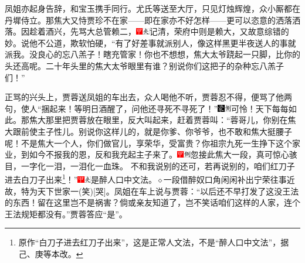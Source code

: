 凤姐亦起身告辞，和宝玉携手同行。尤氏等送至大厅，只见灯烛辉煌，众小厮都在丹墀侍立。那焦大又恃贾珍不在家------即在家亦不好怎样------更可以恣意的洒落洒落。因趁着酒兴，先骂大总管赖二，{\includegraphics[width=3mm]{../Images/00002}\includegraphics[width=3mm]{../Images/00012}\footnotesize \kaishu 记清，荣府中则是赖大，又故意综错的妙。}说他不公道，欺软怕硬，“有了好差事就派别人，像这样黑更半夜送人的事就派我。没良心的忘八羔子！瞎充管家！你也不想想，焦大太爷跷起一只脚，比你的头还高呢。二十年头里的焦大太爷眼里有谁？别说你们这把子的杂种忘八羔子们！”

正骂的兴头上，贾蓉送凤姐的车出去，众人喝他不听，贾蓉忍不得，便骂了他两句，使人“捆起来！等明日酒醒了，问他还寻死不寻死了！”{\includegraphics[width=3mm]{../Images/00006}\includegraphics[width=3mm]{../Images/00011}\footnotesize \kaishu 可怜！天下每每如此。}那焦大那里把贾蓉放在眼里，反大叫起来，赶着贾蓉叫：“蓉哥儿，你别在焦大跟前使主子性儿。别说你这样儿的，就是你爹、你爷爷，也不敢和焦大挺腰子呢！不是焦大一个人，你们做官儿，享荣华，受富贵？你祖宗九死一生挣下这个家业，到如今不报我的恩，反和我充起主子来了。{\includegraphics[width=3mm]{../Images/00002}\includegraphics[width=3mm]{../Images/00011}\footnotesize \kaishu 忽接此焦大一段，真可惊心骇目，一字化一泪，一泪化一血珠。
}不和我说别的还可，若再说别的，咱们红刀子进去白刀子出来\footnote{原作“白刀子进去红刀子出来”，这是正常人文法，不是“醉人口中文法”，据己、庚等本改。}！”{{\includegraphics[width=3mm]{../Images/00002}\includegraphics[width=3mm]{../Images/00012}\footnotesize \kaishu 是醉人口中文法。{$\diamond$}一段借醉奴口角闲闲补出宁荣往事近故，特为天下世家一{(笑)}{[}哭{]}。}}凤姐在车上说与贾蓉：“以后还不早打发了这没王法的东西！留在这里岂不是祸害？倘或亲友知道了，岂不笑话咱们这样的人家，连个王法规矩都没有。”贾蓉答应“是”。

